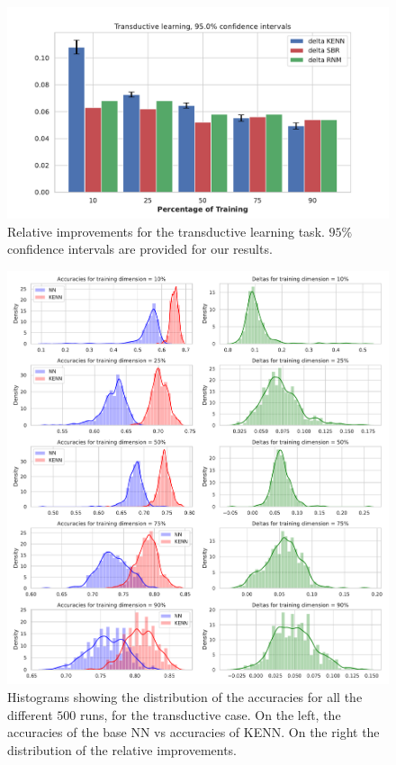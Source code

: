 \begin{figure}
	\centering
	\includegraphics[width=0.8\linewidth]{figures/deltas_transductive.pdf}
		\caption{Relative improvements for the transductive learning task. $95\%$ confidence intervals are provided for our results.}
		\label{fig:transductive_deltas_comparison}
\end{figure}

\begin{figure}
	\centering
	\includegraphics[width=0.95\linewidth]{figures/histograms_transductive.pdf}
	\caption{Histograms showing the distribution of the accuracies for all the different $500$ runs, for the transductive case. On the left, the accuracies of the base NN vs accuracies of KENN. On the right the distribution of the relative improvements.}
	\label{fig:transductive_histograms}
\end{figure}

